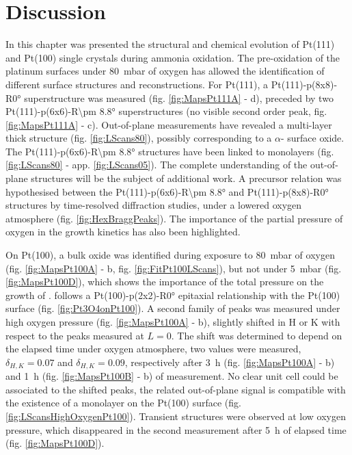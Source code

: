 \section{Discussion}

In this chapter was presented the structural and chemical evolution of Pt(111) and Pt(100) single crystals during ammonia oxidation.
The pre-oxidation of the platinum surfaces under \qty{80}{\milli\bar} of oxygen has allowed the identification of different surface structures and reconstructions.
For Pt(111), a Pt(111)-p(8x8)-R\ang{0} superstructure was measured (fig. \ref{fig:MapsPt111A} - d), preceded by two Pt(111)-p(6x6)-R\ang{\pm 8.8} superstructures (no visible second order peak, fig. \ref{fig:MapsPt111A} - c).
Out-of-plane measurements have revealed a multi-layer thick structure (fig. \ref{fig:LScans80}), possibly corresponding to a $\alpha$- surface oxide.
The Pt(111)-p(6x6)-R\ang{\pm 8.8} structures have been linked to monolayers (fig. \ref{fig:LScans80} - app. \ref{fig:LScans05}).
The complete understanding of the out-of-plane structures will be the subject of additional work.
A precursor relation was hypothesised between the Pt(111)-p(6x6)-R\ang{\pm 8.8} and Pt(111)-p(8x8)-R\ang{0} structures by time-resolved diffraction studies, under a lowered oxygen atmosphere (fig. \ref{fig:HexBraggPeaks}).
The importance of the partial pressure of oxygen in the growth kinetics has also been highlighted.

On Pt(100), a bulk  oxide was identified during exposure to \qty{80}{\milli\bar} of oxygen (fig. \ref{fig:MapsPt100A} - b, fig. \ref{fig:FitPt100LScans}), but not under \qty{5}{\milli\bar} (fig. \ref{fig:MapsPt100D}), which shows the importance of the total pressure on the growth of .
 follows a Pt(100)-p(2x2)-R\ang{0} epitaxial relationship with the Pt(100) surface (fig. \ref{fig:Pt3O4onPt100}).
A second family of peaks was measured under high oxygen pressure (fig. \ref{fig:MapsPt100A} - b), slightly shifted in H or K with respect to the  peaks measured at $L=0$.
The shift was determined to depend on the elapsed time under oxygen atmosphere, two values were measured, $\delta_{H,K}=0.07$ and $\delta_{H,K}=0.09$, respectively after \qty{3}{\hour} (fig. \ref{fig:MapsPt100A} - b) and \qty{1}{\hour} (fig. \ref{fig:MapsPt100B} - b) of measurement.
No clear unit cell could be associated to the shifted peaks, the related out-of-plane signal is compatible with the existence of a monolayer on the Pt(100) surface (fig. \ref{fig:LScansHighOxygenPt100}).
Transient structures were observed at low oxygen pressure, which disappeared in the second measurement after \qty{5}{\hour} of elapsed time (fig. \ref{fig:MapsPt100D}).

